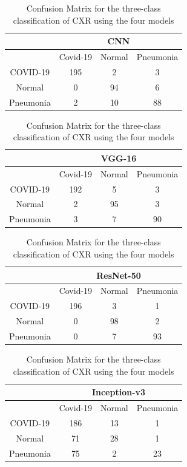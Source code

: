 \documentclass[10pt,journal,compsoc]{IEEEtran}
\begin{document}
\begin{table}
\renewcommand{\arraystretch}{1.3}
\caption{Confusion Matrix for the three-class classification of CXR using the four models}
\label{table_10}
\centering
\begin{tabular}{|c|c|c|c|}
\hline
& \multicolumn{3}{|c|}{\bfseries CNN}   \\
\hline
 & Covid-19 & Normal & Pneumonia \\
\hline
 COVID-19 &   195   & 2   & 3        \\
\hline
   Normal & 0     & 94   & 6         \\
\hline
Pneumonia & 2     & 10   & 88         \\
\hline
   \end{tabular}
   \begin{tabular}{|c|c|c|c|}
\hline
&   \multicolumn{3}{|c|}{\bfseries VGG-16} \\
\hline
 & Covid-19 & Normal & Pneumonia \\
\hline
 COVID-19 &   192   & 5   & 3       \\
\hline
   Normal & 2     & 95   & 3         \\
\hline
Pneumonia & 3     & 7   & 90         \\
\hline
   \end{tabular}

   \begin{tabular}{|c|c|c|c|}
\hline
& \multicolumn{3}{|c|}{\bfseries ResNet-50}   \\
\hline
 & Covid-19 & Normal & Pneumonia \\
\hline
 COVID-19 &   196   & 3  & 1      \\
\hline
   Normal & 0     & 98   & 2       \\
\hline
Pneumonia & 0     & 7   & 93       \\
\hline

   \end{tabular}
\begin{tabular}{|c|c|c|c|}
\hline
&   \multicolumn{3}{|c|}{\bfseries Inception-v3} \\
\hline
 & Covid-19 & Normal & Pneumonia \\
\hline
 COVID-19 &   186   & 13  & 1       \\
\hline
   Normal & 71     & 28   & 1      \\
\hline
Pneumonia & 75     & 2   & 23       \\
\hline

   \end{tabular}

\end{table}
\end{document}
